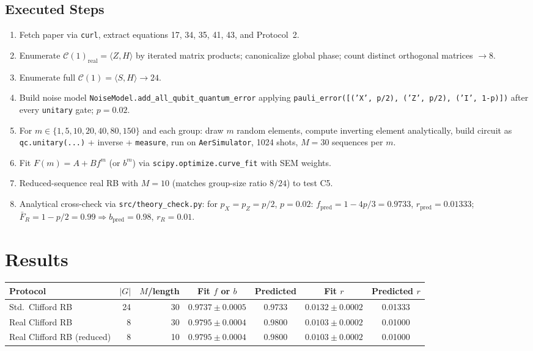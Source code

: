 \documentclass[11pt]{article}
\begin{document}
\subsection{Executed Steps}
\begin{enumerate}
    \item Fetch paper via \texttt{curl}, extract equations 17, 34, 35, 41, 43, and Protocol~2.
    \item Enumerate $\mathcal{C}(1)_{\mathrm{real}} = \langle Z, H\rangle$ by
    iterated matrix products; canonicalize global phase; count distinct
    orthogonal matrices $\rightarrow 8$.
    \item Enumerate full $\mathcal{C}(1) = \langle S, H\rangle \rightarrow 24$.
    \item Build noise model \texttt{NoiseModel.add\_all\_qubit\_quantum\_error}
    applying \texttt{pauli\_error([('X', p/2), ('Z', p/2), ('I', 1-p)])} after
    every \texttt{unitary} gate; $p = 0.02$.
    \item For $m \in \{1,5,10,20,40,80,150\}$ and each group: draw $m$ random
    elements, compute inverting element analytically, build circuit as
    \texttt{qc.unitary(...)} + inverse + \texttt{measure}, run on
    \texttt{AerSimulator}, 1024 shots, $M = 30$ sequences per $m$.
    \item Fit $F(m) = A + B f^m$ (or $b^m$) via \texttt{scipy.optimize.curve\_fit}
    with SEM weights.
    \item Reduced-sequence real RB with $M = 10$ (matches group-size ratio
    $8/24$) to test C5.
    \item Analytical cross-check via \texttt{src/theory\_check.py}:
    for $p_X = p_Z = p/2$, $p = 0.02$: $f_{\text{pred}} = 1 - 4p/3 = 0.9733$,
    $r_{\text{pred}} = 0.01333$; $\bar F_R = 1 - p/2 = 0.99 \Rightarrow
    b_{\text{pred}} = 0.98$, $r_R = 0.01$.
\end{enumerate}

\section{Results}
\begin{center}
\begin{tabular}{lrrcccc}
\toprule
Protocol & $|G|$ & $M$/length & Fit $f$ or $b$ & Predicted & Fit $r$ & Predicted $r$ \\
\midrule
Std.\ Clifford RB          & 24 & 30 & $0.9737\pm0.0005$ & 0.9733 & $0.0132\pm0.0002$ & 0.01333 \\
Real Clifford RB           &  8 & 30 & $0.9795\pm0.0004$ & 0.9800 & $0.0103\pm0.0002$ & 0.01000 \\
Real Clifford RB (reduced) &  8 & 10 & $0.9795\pm0.0004$ & 0.9800 & $0.0103\pm0.0002$ & 0.01000 \\
\bottomrule
\end{tabular}
\end{center}
\end{document}

